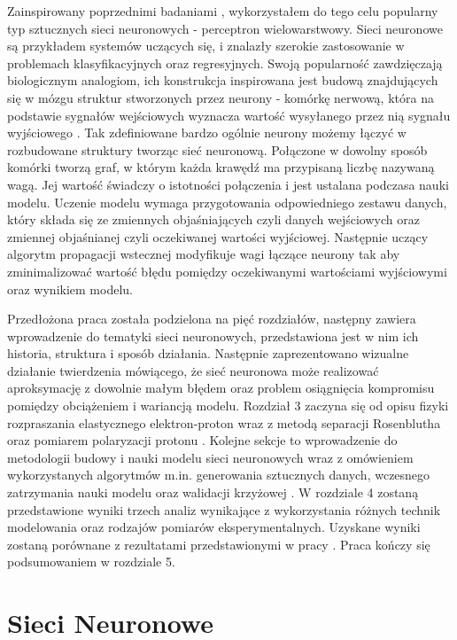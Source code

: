 \documentclass[11pt]{book}
\theoremstyle{definition}
\begin{document}
Zainspirowany poprzednimi badaniami \cite{2009PhRvC..79f5204A}, \cite{PhysRevC.84.034314} wykorzystałem do tego celu popularny typ sztucznych sieci neuronowych - perceptron wielowarstwowy. Sieci neuronowe są przykładem systemów uczących się, i znalazły szerokie zastosowanie w problemach klasyfikacyjnych oraz regresyjnych. Swoją popularność zawdzięczają biologicznym analogiom, ich konstrukcja inspirowana jest budową znajdujących się w mózgu struktur stworzonych przez neurony - komórkę nerwową, która na podstawie sygnałów wejściowych wyznacza wartość wysyłanego przez nią sygnału wyjściowego \cite{1957Rosenblatt}. Tak zdefiniowane bardzo ogólnie neurony możemy łączyć w rozbudowane struktury tworząc sieć neuronową. Połączone w dowolny sposób komórki tworzą graf, w którym każda krawędź ma przypisaną liczbę nazywaną wagą. Jej wartość świadczy o istotności połączenia i jest ustalana podczasa nauki modelu. Uczenie modelu wymaga przygotowania odpowiedniego zestawu danych, który składa się ze zmiennych objaśniających czyli danych wejściowych oraz zmiennej objaśnianej czyli oczekiwanej wartości wyjściowej. Następnie uczący algorytm propagacji wstecznej modyfikuje wagi łączące neurony tak aby zminimalizować wartość błędu pomiędzy oczekiwanymi wartościami wyjściowymi oraz wynikiem modelu. 

Przedłożona praca została podzielona na pięć rozdziałów, następny zawiera wprowadzenie do tematyki sieci neuronowych, przedstawiona jest w nim ich historia, struktura i sposób działania. Następnie zaprezentowano wizualne działanie twierdzenia mówiącego, że sieć neuronowa może realizować aproksymację z dowolnie małym błędem oraz problem osiągnięcia kompromisu pomiędzy obciążeniem i wariancją modelu. Rozdział 3 zaczyna się od opisu fizyki rozpraszania elastycznego elektron-proton wraz z metodą separacji Rosenblutha \cite{PhysRev.79.615} oraz pomiarem polaryzacji protonu \cite{Akhiezer:1974em}. Kolejne sekcje to wprowadzenie do metodologii budowy i nauki modelu sieci neuronowych wraz z omówieniem wykorzystanych algorytmów m.in. generowania sztucznych danych, wczesnego zatrzymania nauki modelu oraz walidacji krzyżowej . W rozdziale 4 zostaną przedstawione wyniki trzech analiz wynikające z wykorzystania różnych technik modelowania oraz rodzajów pomiarów eksperymentalnych. Uzyskane wyniki zostaną porównane z rezultatami przedstawionymi w pracy \cite{PhysRevC.84.034314}. Praca kończy się podsumowaniem w rozdziale 5.



\chapter{Sieci Neuronowe}
\label{sieci}
\end{document}
